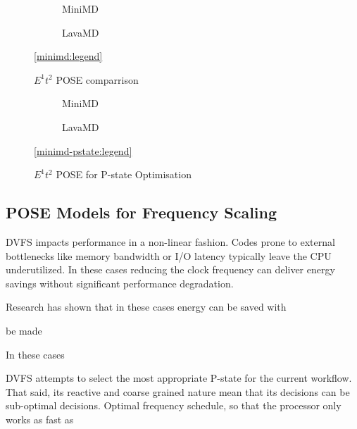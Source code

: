 \begin{figure}[t]%
  \providecommand{\plotwidth}{.95\linewidth}
  \begin{subfigure}[t]{.5\linewidth}%
    \caption{MiniMD}%
    \label{fig:minimd_pose}
  \end{subfigure}%
  \begin{subfigure}[t]{.5\linewidth}%
    \caption{LavaMD}%
    \label{fig:lavamd_pose}
  \end{subfigure}%
  \begin{center}%
    \ref{minimd:legend}%
  \end{center}%
  \caption{$E^1t^2$ POSE comparrison}%
  \label{fig:comparrison}%
\end{figure}

\begin{figure}[t]%
\begin{subfigure}[t]{.5\linewidth}%
\centering%
%
\caption{MiniMD}%
\end{subfigure}%
\begin{subfigure}[t]{.5\linewidth}%
%
\caption{LavaMD}%
\end{subfigure}%
\begin{center}%
\ref{minimd-pstate:legend}%
\end{center}%
\caption{$E^1t^2$ POSE for P-state Optimisation}%
\label{fig:pstates}%
\end{figure}%


\subsection{POSE Models for Frequency Scaling}
DVFS impacts performance in a non-linear fashion. 
Codes prone to external bottlenecks like memory bandwidth or I/O latency typically leave the CPU underutilized.
In these cases reducing the clock frequency can deliver energy savings without significant performance degradation. 

Research has shown that in these cases energy can be saved with 

be made 


In these cases



DVFS attempts to select the most appropriate P-state for the current workflow.
That said, its reactive and coarse grained nature mean that its decisions can be sub-optimal decisions.
Optimal frequency schedule, so that the processor only works as fast as 

